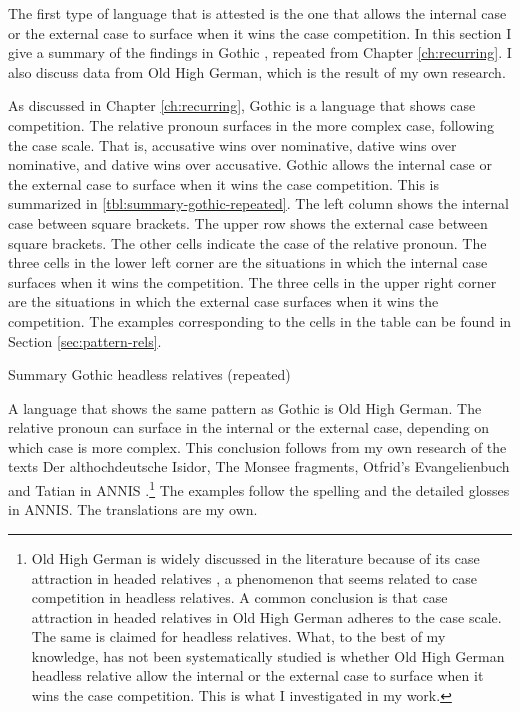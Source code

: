 The first type of language that is attested is the one that allows the internal case or the external case to surface when it wins the case competition. In this section I give a summary of the findings in Gothic \citep{harbert1978}, repeated from Chapter \ref{ch:recurring}. I also discuss data from Old High German, which is the result of my own research.

As discussed in Chapter \ref{ch:recurring}, Gothic is a language that shows case competition. The relative pronoun surfaces in the more complex case, following the case scale. That is, accusative wins over nominative, dative wins over nominative, and dative wins over accusative.
Gothic allows the internal case or the external case to surface when it wins the case competition. This is summarized in \ref{tbl:summary-gothic-repeated}. The left column shows the internal case between square brackets. The upper row shows the external case between square brackets. The other cells indicate the case of the relative pronoun.
The three cells in the lower left corner are the situations in which the internal case surfaces when it wins the competition. The three cells in the upper right corner are the situations in which the external case surfaces when it wins the competition.
The examples corresponding to the cells in the table can be found in Section \ref{sec:pattern-rels}.

\begin{table}[H]
  \center
  \caption{Summary Gothic headless relatives (repeated)}
    
    \label{tbl:summary-gothic-repeated}
\end{table}

A language that shows the same pattern as Gothic is Old High German. The relative pronoun can surface in the internal or the external case, depending on which case is more complex. This conclusion follows from my own research of the texts Der althochdeutsche Isidor, The Monsee fragments, Otfrid's Evangelienbuch and Tatian in ANNIS \citep{krause2016}.\footnote{
Old High German is widely discussed in the literature because of its case attraction in headed relatives \citep[cf.][]{pittner1995}, a phenomenon that seems related to case competition in headless relatives. A common conclusion is that case attraction in headed relatives in Old High German adheres to the case scale. The same is claimed for headless relatives.
What, to the best of my knowledge, has not been systematically studied is whether Old High German headless relative allow the internal or the external case to surface when it wins the case competition. This is what I investigated in my work.
}
The examples follow the spelling and the detailed glosses in ANNIS. The translations are my own.

